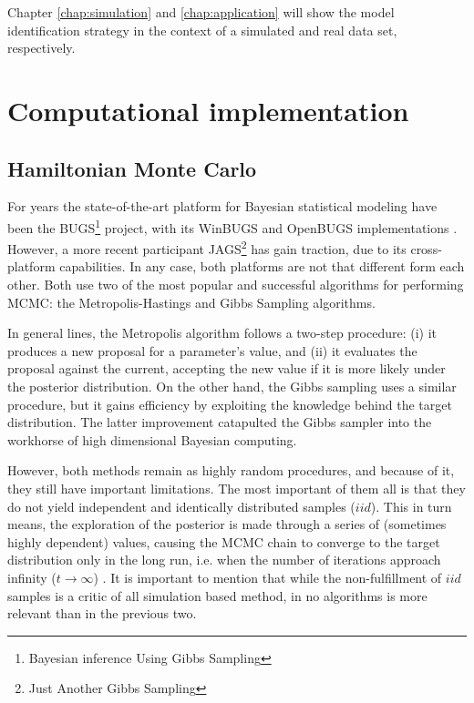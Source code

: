 Chapter \ref{chap:simulation} and \ref{chap:application} will show the model identification strategy in the context of a simulated and real data set, respectively.



\section{Computational implementation} \label{sect:comp_imp}

\subsection{Hamiltonian Monte Carlo} \label{sub_sect:hmc}

For years the state-of-the-art platform for Bayesian statistical modeling have been the BUGS\footnote{Bayesian inference Using Gibbs Sampling} project, with its WinBUGS and OpenBUGS implementations \cite{Lunn_et_al_2000, Lunn_et_al_2009}. However, a more recent participant JAGS\footnote{Just Another Gibbs Sampling} \cite{Plummer_2003} has gain traction, due to its cross-platform capabilities. In any case, both platforms are not that different form each other. Both use two of the most popular and successful algorithms for performing MCMC: the Metropolis-Hastings \cite{Metropolis_et_al_1953, Hastings_1970} and Gibbs Sampling \cite{Geman_et_al_1984} algorithms.

In general lines, the Metropolis algorithm follows a two-step procedure: (i) it produces a new proposal for a parameter's value, and (ii) it evaluates the proposal against the current, accepting the new value if it is more likely under the posterior distribution. On the other hand, the Gibbs sampling uses a similar procedure, but it gains efficiency by exploiting the knowledge behind the target distribution. The latter improvement catapulted the Gibbs sampler into the workhorse of high dimensional Bayesian computing. 

However, both methods remain as highly random procedures, and because of it, they still have important limitations. The most important of them all is that they do not yield independent and identically distributed samples ($iid$). This in turn means, the exploration of the posterior is made through a series of (sometimes highly dependent) values, causing the MCMC chain to converge to the target distribution only in the long run, i.e. when the number of iterations approach infinity ($t \rightarrow \infty$) \cite{Gelman_et_al_2014}. It is important to mention that while the non-fulfillment of $iid$ samples is a critic of all simulation based method, in no algorithms is more relevant than in the previous two. 

